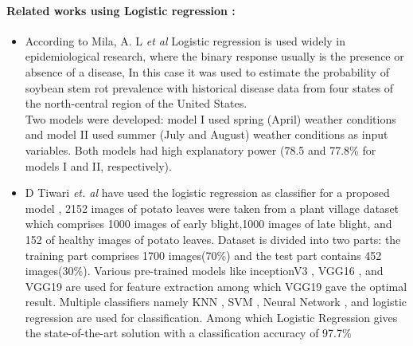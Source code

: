\paragraph{Related works using Logistic regression :}
\begin{itemize}
    \item According to  Mila, A. L \textit{et al} \cite{art10} Logistic regression is used widely in epidemiological research, where the binary response usually is the presence or absence of a disease, In this case it was used to estimate the probability of soybean stem rot  prevalence with historical disease data from four states of the north-central region of the United States.\vspace{4mm} \\
    Two models were developed: model I used spring (April) weather conditions and model II used summer (July and August) weather conditions as input variables. Both models had high explanatory power (78.5 and 77.8\% for models I and II, respectively).

    \item D Tiwari \textit{et. al} \cite{art11} have used the logistic regression as classifier for a proposed model , 2152 images of potato leaves were taken from a plant village dataset which comprises 1000 images of early blight,1000 images of late blight, and 152 of healthy images of potato leaves. Dataset is divided into two parts: the training part comprises 1700 images(70\%) and the test part contains 452 images(30\%). Various pre-trained models like inceptionV3 , VGG16 , and VGG19  are used for feature extraction among which VGG19 gave the optimal result.\vspace{4mm}
    Multiple classifiers namely KNN , SVM , Neural Network , and logistic regression are used for classification. Among which Logistic Regression gives the state-of-the-art solution with a classification accuracy of 97.7\%

\end{itemize}

